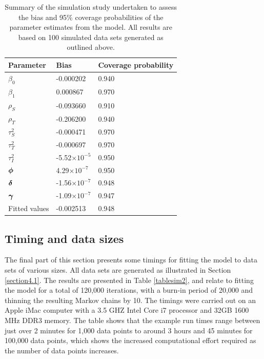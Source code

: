 \documentclass[article, nojss]{jss}
\newcommand{\bd}[1]{\ensuremath{\mbox{\boldmath $#1$}}}
\begin{document}
\begin{table}
\begin{center}
\begin{tabular}{lll}
\hline \textbf{Parameter}&\textbf{Bias}&\textbf{Coverage probability}\\\hline
$\beta_0$&-0.000202&0.940\\
$\beta_1$&0.000867&0.970\\
$\rho_S$ &-0.093660&0.910\\
$\rho_T$ &-0.206200&0.940\\
$\tau^2_S$ &-0.000471&0.970\\
$\tau^2_T$ &-0.000697&0.970\\
$\tau^2_I$ &-5.52$\times 10^{-5}$ & 0.950\\
$\bd{\phi}$ &4.29$\times 10^{-7}$ & 0.950\\
$\bd{\delta}$ &-1.56$\times 10^{-7}$ &0.948\\
$\bd{\gamma}$ &-1.09$\times 10^{-7}$ &0.947\\
Fitted values &-0.002513& 0.948\\\hline
\end{tabular}

\caption{Summary of the simulation study undertaken to assess the bias and 95\% coverage probabilities of the parameter estimates from the  model. All results are based on 100 simulated data sets generated as outlined above.\label{tablesim1}}
\end{center}
\end{table}







\subsection{Timing and data sizes}
The final part of this section presents some timings for fitting the  model to data sets of various sizes. All data sets are generated as illustrated in Section \ref{section4.1}. The results are presented in Table \ref{tablesim2}, and relate to fitting the model for a total of 120,000 iterations, with a burn-in period of 20,000 and thinning the resulting Markov chains by 10. The timings were carried out on an Apple iMac computer with a 3.5 GHZ Intel Core i7 processor and 32GB 1600 MHz DDR3 memory. The table shows that the example run times range between just over 2 minutes for 1,000 data points to around 3 hours and 45 minutes for 100,000 data points, which shows the increased computational effort required as the number of data points increases.
\end{document}
